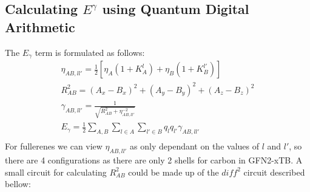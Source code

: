 \documentclass{article}
\begin{document}
\subsection{Calculating $E^\gamma$ using Quantum Digital Arithmetic}
The $E_\gamma$ term is formulated as follows:
\begin{gather}
    \eta_{AB,ll'} = \frac{1}{2}\left[\eta_A(1+K_A^l)+\eta_B(1+K_B^{l'})\right]\\
    R_{AB}^2 = (A_x-B_x)^2+(A_y-B_y)^2+(A_z-B_z)^2\\
    \gamma_{AB,ll'}=\frac{1}{\sqrt{R_{AB}^2+\eta_{AB,ll'}^{-2}}}\\
    E_\gamma=\frac{1}{2}\sum_{A,B}\sum_{l\in A}\sum_{l'\in B} q_lq_{l'}\gamma_{AB,ll'}\\
\end{gather}
For fullerenes we can view $\eta_{AB,ll'}$ as only dependant on the values of $l$ and $l'$, so there are 4 configurations as there are only 2 shells for carbon in GFN2-xTB. 
A small circuit for calculating $R_{AB}^2$ could be made up of the $diff^2$ circuit described bellow:
\end{document}
